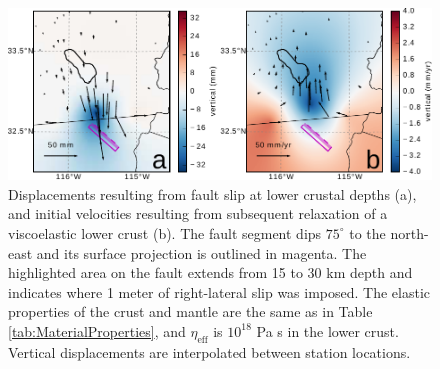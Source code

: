 \documentclass[draft,linenumbers]{AGUJournal}
\begin{document}
\begin{figure}
\includegraphics[scale=0.8]{Figures/Cancellation}
\caption{Displacements resulting from fault slip at lower crustal depths (a), and initial velocities resulting from subsequent relaxation of a viscoelastic lower crust (b).  The fault segment dips $75^\circ$ to the north-east and its surface projection is outlined in magenta.  The highlighted area on the fault extends from 15 to 30 km depth and indicates where 1 meter of right-lateral slip was imposed.  The elastic properties of the crust and mantle are the same as in Table \ref{tab:MaterialProperties}, and $\eta_\mathrm{eff}$  is $10^{18}$ Pa s in the lower crust.  Vertical displacements are interpolated between station locations.}
\label{fig:LowerCrust}
\end{figure}
 
\end{document}
